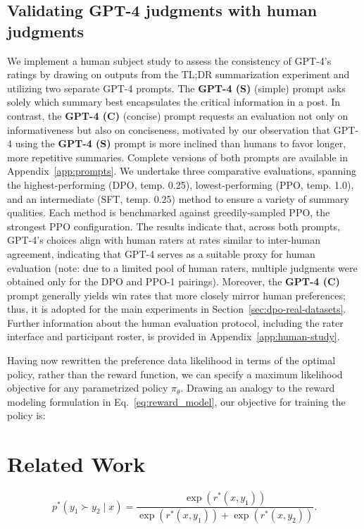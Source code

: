 \subsection{Validating GPT-4 judgments with human judgments}
\label{sec:human-judgments}
We implement a human subject study to assess the consistency of GPT-4's ratings by drawing on outputs from the TL;DR summarization experiment and utilizing two separate GPT-4 prompts. The \textbf{GPT-4 (S)} (simple) prompt asks solely which summary best encapsulates the critical information in a post. In contrast, the \textbf{GPT-4 (C)} (concise) prompt requests an evaluation not only on informativeness but also on conciseness, motivated by our observation that GPT-4 using the \textbf{GPT-4 (S)} prompt is more inclined than humans to favor longer, more repetitive summaries. Complete versions of both prompts are available in Appendix~\ref{app:prompts}. We undertake three comparative evaluations, spanning the highest-performing (DPO, temp. 0.25), lowest-performing (PPO, temp. 1.0), and an intermediate (SFT, temp. 0.25) method to ensure a variety of summary qualities. Each method is benchmarked against greedily-sampled PPO, the strongest PPO configuration. The results indicate that, across both prompts, GPT-4's choices align with human raters at rates similar to inter-human agreement, indicating that GPT-4 serves as a suitable proxy for human evaluation (note: due to a limited pool of human raters, multiple judgments were obtained only for the DPO and PPO-1 pairings). Moreover, the \textbf{GPT-4 (C)} prompt generally yields win rates that more closely mirror human preferences; thus, it is adopted for the main experiments in Section~\ref{sec:dpo-real-datasets}. Further information about the human evaluation protocol, including the rater interface and participant roster, is provided in Appendix~\ref{app:human-study}.

Having now rewritten the preference data likelihood in terms of the optimal policy, rather than the reward function, we can specify a maximum likelihood objective for any parametrized policy $\pi_\theta$. Drawing an analogy to the reward modeling formulation in Eq.~\ref{eq:reward_model}, our objective for training the policy is:

\section{Related Work}

\begin{equation}\label{eq:bradley-terry}
    p^*(y_1\succ y_2 \mid x)=\frac{\exp\left(r^*(x, y_1)\right)}{\exp\left(r^*(x, y_1)\right) + \exp\left(r^*(x, y_2)\right)}.
\end{equation}

